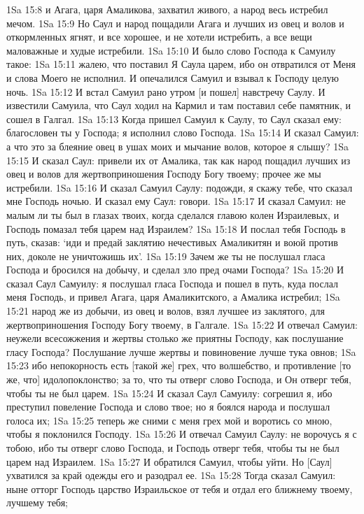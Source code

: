 1Sa 15:8  и Агага, царя Амаликова, захватил живого, а народ весь истребил мечом.
1Sa 15:9  Но Саул и народ пощадили Агага и лучших из овец и волов и откормленных ягнят, и все хорошее, и не хотели истребить, а все вещи маловажные и худые истребили.
1Sa 15:10  И было слово Господа к Самуилу такое:
1Sa 15:11  жалею, что поставил Я Саула царем, ибо он отвратился от Меня и слова Моего не исполнил. И опечалился Самуил и взывал к Господу целую ночь.
1Sa 15:12  И встал Самуил рано утром [и пошел] навстречу Саулу. И известили Самуила, что Саул ходил на Кармил и там поставил себе памятник, и сошел в Галгал.
1Sa 15:13  Когда пришел Самуил к Саулу, то Саул сказал ему: благословен ты у Господа; я исполнил слово Господа.
1Sa 15:14  И сказал Самуил: а что это за блеяние овец в ушах моих и мычание волов, которое я слышу?
1Sa 15:15  И сказал Саул: привели их от Амалика, так как народ пощадил лучших из овец и волов для жертвоприношения Господу Богу твоему; прочее же мы истребили.
1Sa 15:16  И сказал Самуил Саулу: подожди, я скажу тебе, что сказал мне Господь ночью. И сказал ему Саул: говори.
1Sa 15:17  И сказал Самуил: не малым ли ты был в глазах твоих, когда сделался главою колен Израилевых, и Господь помазал тебя царем над Израилем?
1Sa 15:18  И послал тебя Господь в путь, сказав: `иди и предай заклятию нечестивых Амаликитян и воюй против них, доколе не уничтожишь их'.
1Sa 15:19  Зачем же ты не послушал гласа Господа и бросился на добычу, и сделал зло пред очами Господа?
1Sa 15:20  И сказал Саул Самуилу: я послушал гласа Господа и пошел в путь, куда послал меня Господь, и привел Агага, царя Амаликитского, а Амалика истребил;
1Sa 15:21  народ же из добычи, из овец и волов, взял лучшее из заклятого, для жертвоприношения Господу Богу твоему, в Галгале.
1Sa 15:22  И отвечал Самуил: неужели всесожжения и жертвы столько же приятны Господу, как послушание гласу Господа? Послушание лучше жертвы и повиновение лучше тука овнов;
1Sa 15:23  ибо непокорность есть [такой же] грех, что волшебство, и противление [то же, что] идолопоклонство; за то, что ты отверг слово Господа, и Он отверг тебя, чтобы ты не был царем.
1Sa 15:24  И сказал Саул Самуилу: согрешил я, ибо преступил повеление Господа и слово твое; но я боялся народа и послушал голоса их;
1Sa 15:25  теперь же сними с меня грех мой и воротись со мною, чтобы я поклонился Господу.
1Sa 15:26  И отвечал Самуил Саулу: не ворочусь я с тобою, ибо ты отверг слово Господа, и Господь отверг тебя, чтобы ты не был царем над Израилем.
1Sa 15:27  И обратился Самуил, чтобы уйти. Но [Саул] ухватился за край одежды его и разодрал ее.
1Sa 15:28  Тогда сказал Самуил: ныне отторг Господь царство Израильское от тебя и отдал его ближнему твоему, лучшему тебя;
